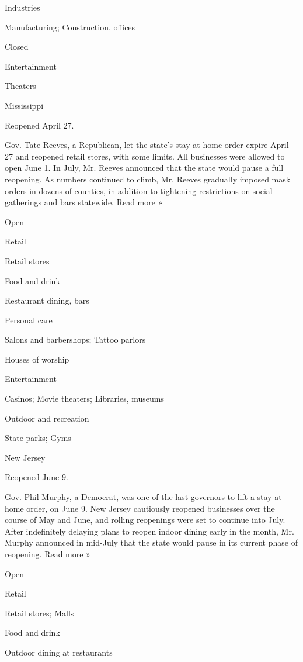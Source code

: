 Industries

Manufacturing; Construction, offices

Closed

Entertainment

Theaters

Mississippi

Reopened April 27.

Gov. Tate Reeves, a Republican, let the state's stay-at-home order
expire April 27 and reopened retail stores, with some limits. All
businesses were allowed to open June 1. In July, Mr. Reeves announced
that the state would pause a full reopening. As numbers continued to
climb, Mr. Reeves gradually imposed mask orders in dozens of counties,
in addition to tightening restrictions on social gatherings and bars
statewide.
\href{https://www.sunherald.com/news/coronavirus/article244467187.html}{Read
more »}

Open

Retail

Retail stores

Food and drink

Restaurant dining, bars

Personal care

Salons and barbershops; Tattoo parlors

Houses of worship

Entertainment

Casinos; Movie theaters; Libraries, museums

Outdoor and recreation

State parks; Gyms

New Jersey

Reopened June 9.

Gov. Phil Murphy, a Democrat, was one of the last governors to lift a
stay-at-home order, on June 9. New Jersey cautiously reopened businesses
over the course of May and June, and rolling reopenings were set to
continue into July. After indefinitely delaying plans to reopen indoor
dining early in the month, Mr. Murphy announced in mid-July that the
state would pause in its current phase of reopening.
\href{https://www.nj.com/coronavirus/2020/07/murphy-hitting-pause-on-reopening-as-coronavirus-rate-of-transmission-rises.html}{Read
more »}

Open

Retail

Retail stores; Malls

Food and drink

Outdoor dining at restaurants

